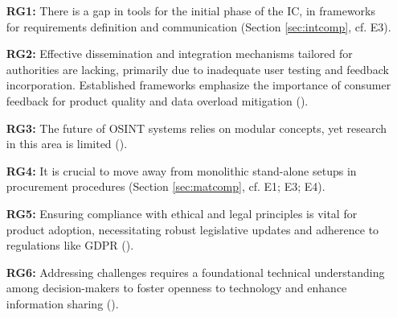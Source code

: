 \documentclass[10pt]{article}
\begin{document}
%
%

\begin{itemize}
    \item[\textbf{RG1:}] There is a gap in tools for the initial phase of the IC, in frameworks for requirements definition and communication (Section \ref{sec:intcomp}, cf. E3).

    \item[\textbf{RG2:}] Effective dissemination and integration mechanisms tailored for authorities are lacking, primarily due to inadequate user testing and feedback incorporation. Established frameworks emphasize the importance of consumer feedback for product quality and data overload mitigation (\cite{JointChiefsofStaffU.S.Army.2013, NorthAtlanticTreatyOrganization.2001}).

    \item[\textbf{RG3:}] The future of OSINT systems relies on modular concepts, yet research in this area is limited (\cite{Arjun.2020,Wright.2020}).

    \item[\textbf{RG4:}] It is crucial to move away from monolithic stand-alone setups in procurement procedures (Section \ref{sec:matcomp}, cf. E1; E3; E4).

    \item[\textbf{RG5:}] Ensuring compliance with ethical and legal principles is vital for product adoption, necessitating robust legislative updates and adherence to regulations like GDPR (\cite{EuropeanParliament.2016, Wittmer.2022}).

    \item[\textbf{RG6:}] Addressing challenges requires a foundational technical understanding among decision-makers to foster openness to technology and enhance information sharing (\cite{NorthAtlanticTreatyOrganization.2001}).


\end{itemize}
\end{document}
